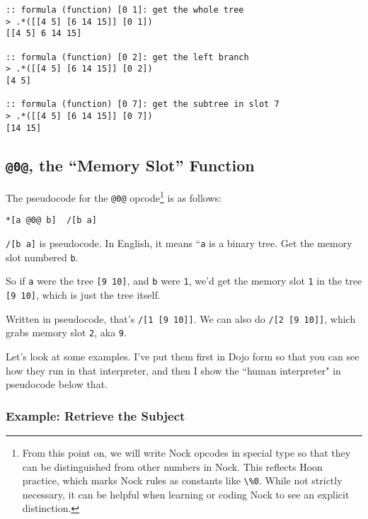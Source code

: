 \documentclass[twoside]{article}
\begin{document}
\begin{lstlisting}[style=listingcode]
:: formula (function) [0 1]: get the whole tree
> .*([[4 5] [6 14 15]] [0 1])
[[4 5] 6 14 15]

:: formula (function) [0 2]: get the left branch
> .*([[4 5] [6 14 15]] [0 2])
[4 5]

:: formula (function) [0 7]: get the subtree in slot 7
> .*([[4 5] [6 14 15]] [0 7])
[14 15]
\end{lstlisting}

\subsection{\lstinline[style=inlinecode]{@0@}, the “Memory Slot” Function}
\label{sxn:nock0}

The pseudocode for the \lstinline[style=inlinecode]{@0@} opcode\footnote{From this point on, we will write Nock opcodes in special type so that they can be distinguished from other numbers in Nock.  This reflects Hoon practice, which marks Nock rules as constants like \lstinline[style=inlinecode]{\%0}.  While not strictly necessary, it can be helpful when learning or coding Nock to see an explicit distinction.} is as follows:

\begin{lstlisting}[style=listingcode]
*[a @0@ b]  /[b a]
\end{lstlisting}

\lstinline[style=inlinecode]{/[b a]} is pseudocode. In English, it means ``\lstinline[style=inlinecode]{a} is a binary tree. Get the memory slot numbered \lstinline[style=inlinecode]{b}.

So if \lstinline[style=inlinecode]{a} were the tree \lstinline[style=inlinecode]{[9 10]}, and \lstinline[style=inlinecode]{b} were \lstinline[style=inlinecode]{1}, we'd get the memory slot \lstinline[style=inlinecode]{1} in the tree \lstinline[style=inlinecode]{[9 10]}, which is just the tree itself.

Written in pseudocode, that's \lstinline[style=inlinecode]{/[1 [9 10]]}. We can also do \lstinline[style=inlinecode]{/[2 [9 10]]}, which grabs memory slot \lstinline[style=inlinecode]{2}, aka \lstinline[style=inlinecode]{9}.

Let's look at some examples. I've put them first in Dojo form so that you can see how they run in that interpreter, and then I show the ``human interpreter" in pseudocode below that.

\subsubsection{Example:  Retrieve the Subject}
\end{document}
